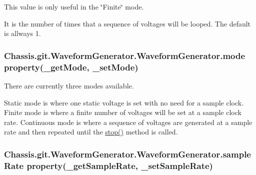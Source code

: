 This value is only useful in the \char`\"{}\-Finite\char`\"{} mode. 

It is the number of times that a sequence of voltages will be looped. The default is allways 1. \hypertarget{class_chassis_8git_1_1_waveform_generator_1_1_waveform_generator_a523b65929f8a3fa8af88d5c6a2e4297e}{
\subsubsection[{mode}]{\setlength{\rightskip}{0pt plus 5cm}Chassis.\-git.\-Waveform\-Generator.\-Waveform\-Generator.\-mode property(\-\_\-get\-Mode, \-\_\-set\-Mode)\hspace{0.3cm}{\ttfamily [static]}}}\label{class_chassis_8git_1_1_waveform_generator_1_1_waveform_generator_a523b65929f8a3fa8af88d5c6a2e4297e}


There are currently three modes available. 

Static mode is where one static voltage is set with no need for a sample clock. Finite mode is where a finite number of voltages will be set at a sample clock rate. Continuous mode is where a sequence of voltages are generated at a sample rate and then repeated until the \hyperlink{class_chassis_8git_1_1_waveform_generator_1_1_waveform_generator_adfad9d232df552a816806584d30fd9ab}{stop()} method is called. \hypertarget{class_chassis_8git_1_1_waveform_generator_1_1_waveform_generator_a4152a26948eb36959f5ee99440dfa911}{
\subsubsection[{sample\-Rate}]{\setlength{\rightskip}{0pt plus 5cm}Chassis.\-git.\-Waveform\-Generator.\-Waveform\-Generator.\-sample\-Rate property(\-\_\-get\-Sample\-Rate, \-\_\-set\-Sample\-Rate)\hspace{0.3cm}{\ttfamily [static]}}}\label{class_chassis_8git_1_1_waveform_generator_1_1_waveform_generator_a4152a26948eb36959f5ee99440dfa911}


